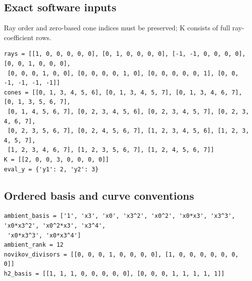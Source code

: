 \documentclass[10pt,a4paper]{article}
\begin{document}
\subsection*{Exact software inputs}
Ray order and zero-based cone indices must be preserved; K consists of full ray-coefficient rows.
\begin{lstlisting}
rays = [[1, 0, 0, 0, 0, 0], [0, 1, 0, 0, 0, 0], [-1, -1, 0, 0, 0, 0], [0, 0, 1, 0, 0, 0],
 [0, 0, 0, 1, 0, 0], [0, 0, 0, 0, 1, 0], [0, 0, 0, 0, 0, 1], [0, 0, -1, -1, -1, -1]]
cones = [[0, 1, 3, 4, 5, 6], [0, 1, 3, 4, 5, 7], [0, 1, 3, 4, 6, 7], [0, 1, 3, 5, 6, 7],
 [0, 1, 4, 5, 6, 7], [0, 2, 3, 4, 5, 6], [0, 2, 3, 4, 5, 7], [0, 2, 3, 4, 6, 7],
 [0, 2, 3, 5, 6, 7], [0, 2, 4, 5, 6, 7], [1, 2, 3, 4, 5, 6], [1, 2, 3, 4, 5, 7],
 [1, 2, 3, 4, 6, 7], [1, 2, 3, 5, 6, 7], [1, 2, 4, 5, 6, 7]]
K = [[2, 0, 0, 3, 0, 0, 0, 0]]
eval_y = {'y1': 2, 'y2': 3}
\end{lstlisting}
\subsection*{Ordered basis and curve conventions}
\begin{lstlisting}
ambient_basis = ['1', 'x3', 'x0', 'x3^2', 'x0^2', 'x0*x3', 'x3^3', 'x0*x3^2', 'x0^2*x3', 'x3^4',
 'x0*x3^3', 'x0*x3^4']
ambient_rank = 12
novikov_divisors = [[0, 0, 0, 1, 0, 0, 0, 0], [1, 0, 0, 0, 0, 0, 0, 0]]
h2_basis = [[1, 1, 1, 0, 0, 0, 0, 0], [0, 0, 0, 1, 1, 1, 1, 1]]
\end{lstlisting}
\end{document}
